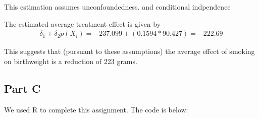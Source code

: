 \documentclass[letterpaper, 12pt]{article}
\begin{document}
This estimation assumes unconfoundedness. and conditional indpendence



The estimated average treatment effect is given by 
\begin{align*}
\delta_1 + \delta_2 \overbar{p}(X_i)=
 -237.099 + (0.1594*90.427)=
-222.69
\end{align*}

This suggests that (pursuant to these assumptions) the average effect of smoking on birthweight is a reduction of 223 grams.

\subsection{Part C}





We used R to complete this assignment.  The code is below:




\end{document}
